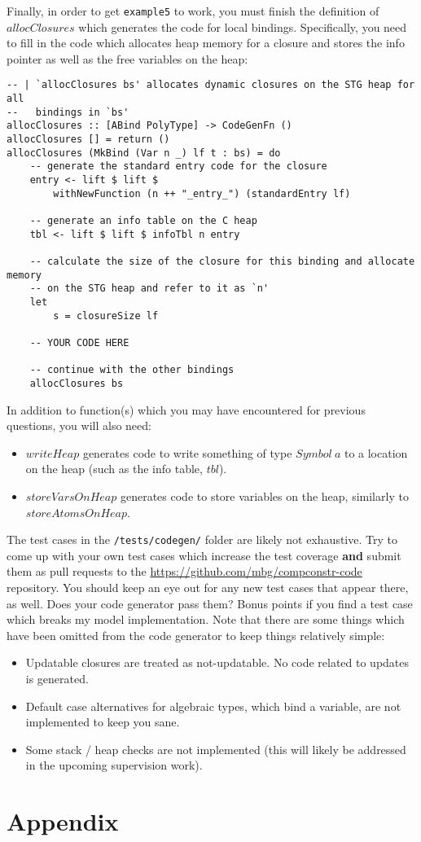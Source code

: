 \documentclass[10pt,a4paper]{exam} %
\begin{document}
\begin{questions}
\question Finally, in order to get \texttt{example5} to work, you must finish the definition of $\mathit{allocClosures}$ which generates the code for local bindings. Specifically, you need to fill in the code which allocates heap memory for a closure and stores the info pointer as well as the free variables on the heap:
\begin{verbatim}
-- | `allocClosures bs' allocates dynamic closures on the STG heap for all
--   bindings in `bs'
allocClosures :: [ABind PolyType] -> CodeGenFn ()
allocClosures [] = return ()
allocClosures (MkBind (Var n _) lf t : bs) = do
    -- generate the standard entry code for the closure
    entry <- lift $ lift $
        withNewFunction (n ++ "_entry_") (standardEntry lf)

    -- generate an info table on the C heap
    tbl <- lift $ lift $ infoTbl n entry

    -- calculate the size of the closure for this binding and allocate memory
    -- on the STG heap and refer to it as `n'
    let
        s = closureSize lf

    -- YOUR CODE HERE

    -- continue with the other bindings
    allocClosures bs
\end{verbatim}
In addition to function(s) which you may have encountered for previous questions, you will also need:
\begin{itemize}
\item $\mathit{writeHeap}$ generates code to write something of type $\mathit{Symbol}~a$ to a location on the heap (such as the info table, $\mathit{tbl}$).
\item $\mathit{storeVarsOnHeap}$ generates code to store variables on the heap, similarly to $\mathit{storeAtomsOnHeap}$.
\end{itemize}

\question The test cases in the \texttt{/tests/codegen/} folder are likely not exhaustive. Try to come up with your own test cases which increase the test coverage \textbf{and} submit them as pull requests to the \url{https://github.com/mbg/compconstr-code} repository. You should keep an eye out for any new test cases that appear there, as well. Does your code generator pass them? Bonus points if you find a test case which breaks my model implementation. Note that there are some things which have been omitted from the code generator to keep things relatively simple:
\begin{itemize}
\item Updatable closures are treated as not-updatable. No code related to updates is generated.
\item Default case alternatives for algebraic types, which bind a variable, are not implemented to keep you sane. 
\item Some stack / heap checks are not implemented (this will likely be addressed in the upcoming supervision work).
\end{itemize}
\end{questions}

\newpage
\appendix
\section{Appendix}

 \pagebreak


\end{document}
